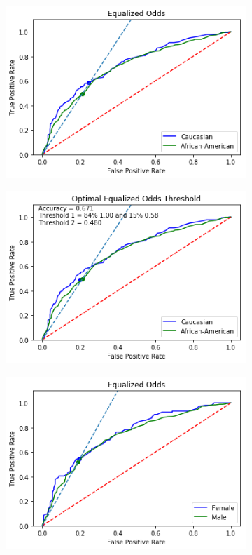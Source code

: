 \documentclass[11pt, fleqn, titlepage]{article}
\begin{document}
	\begin{figure}[H]
		\centering
		\begin{subfigure}{0.5\textwidth}
			\centering
			\includegraphics[width=0.9\linewidth]{"imgs/Equalized Odds Optimal"}
		\end{subfigure}%
		\begin{subfigure}{0.5\textwidth}
			\centering
			\includegraphics[width=0.9\linewidth]{"imgs/Equalized Odds Correctied"}
		\end{subfigure}
		\begin{subfigure}{0.5\textwidth}
			\centering
			\includegraphics[width=0.9\linewidth]{"imgs/Equalized Odds Optimal_sex"}

\end{subfigure}
\end{figure}
\end{document}
